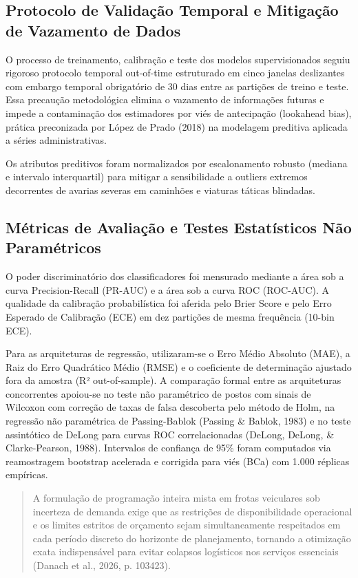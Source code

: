 \documentclass[12pt,a4paper]{article}
\begin{document}
\subsection{Protocolo de Validação Temporal e Mitigação de Vazamento de Dados}

O processo de treinamento, calibração e teste dos modelos supervisionados seguiu rigoroso protocolo temporal out-of-time estruturado em cinco janelas deslizantes com embargo temporal obrigatório de 30 dias entre as partições de treino e teste. Essa precaução metodológica elimina o vazamento de informações futuras e impede a contaminação dos estimadores por viés de antecipação (lookahead bias), prática preconizada por López de Prado (2018) na modelagem preditiva aplicada a séries administrativas.

Os atributos preditivos foram normalizados por escalonamento robusto (mediana e intervalo interquartil) para mitigar a sensibilidade a outliers extremos decorrentes de avarias severas em caminhões e viaturas táticas blindadas.


\subsection{Métricas de Avaliação e Testes Estatísticos Não Paramétricos}

O poder discriminatório dos classificadores foi mensurado mediante a área sob a curva Precision-Recall (PR-AUC) e a área sob a curva ROC (ROC-AUC). A qualidade da calibração probabilística foi aferida pelo Brier Score e pelo Erro Esperado de Calibração (ECE) em dez partições de mesma frequência (10-bin ECE).

Para as arquiteturas de regressão, utilizaram-se o Erro Médio Absoluto (MAE), a Raiz do Erro Quadrático Médio (RMSE) e o coeficiente de determinação ajustado fora da amostra (R² out-of-sample). A comparação formal entre as arquiteturas concorrentes apoiou-se no teste não paramétrico de postos com sinais de Wilcoxon com correção de taxas de falsa descoberta pelo método de Holm, na regressão não paramétrica de Passing-Bablok (Passing \& Bablok, 1983) e no teste assintótico de DeLong para curvas ROC correlacionadas (DeLong, DeLong, \& Clarke-Pearson, 1988). Intervalos de confiança de 95\% foram computados via reamostragem bootstrap acelerada e corrigida para viés (BCa) com 1.000 réplicas empíricas.

\begin{quote}
\small A formulação de programação inteira mista em frotas veiculares sob incerteza de demanda exige que as restrições de disponibilidade operacional e os limites estritos de orçamento sejam simultaneamente respeitados em cada período discreto do horizonte de planejamento, tornando a otimização exata indispensável para evitar colapsos logísticos nos serviços essenciais (Danach et al., 2026, p. 103423).
\end{quote}
\end{document}
